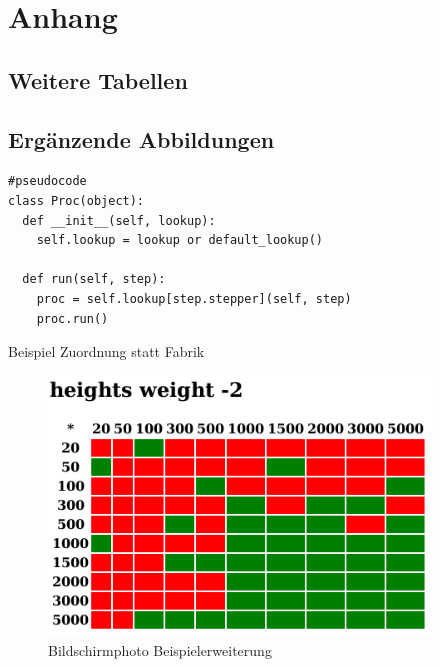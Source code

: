 \appendix
\chapter{Anhang}
\section{Weitere Tabellen}




\section{Ergänzende Abbildungen}

\begin{listing}[h]
\centering
\begin{verbatim}
#pseudocode
class Proc(object):
  def __init__(self, lookup):
    self.lookup = lookup or default_lookup()

  def run(self, step):
    proc = self.lookup[step.stepper](self, step)
    proc.run()
\end{verbatim}
\caption{Beispiel Zuordnung statt Fabrik}
\label{fig:fabrik-mapping}
\end{listing}


\begin{figure}
    \centering
    \includegraphics[width=4in]{images/exemplar-ausgabe.png}
    \caption{Bildschirmphoto Beispielerweiterung}
    \label{fig:beispielerweiterung-screenshoot}
\end{figure}

